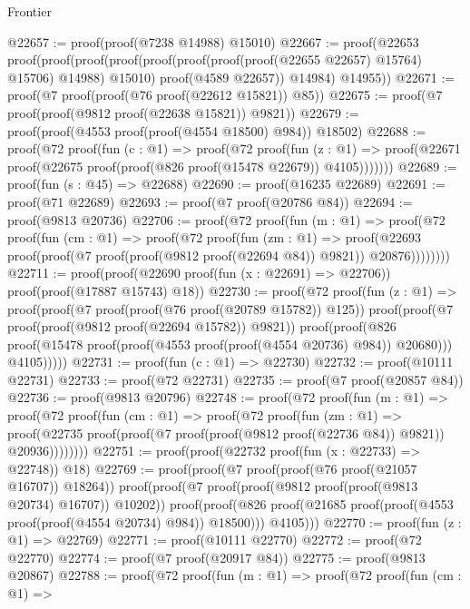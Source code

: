 \begin{lexlean}{Frontier}
\begin{coremodule}
@22657 := proof(proof(@7238 @14988) @15010)
@22667 := proof(@22653
      proof(proof(proof(proof(proof(proof(proof(proof(@22655 @22657) @15764) @15706) @14988) @15010)
              proof(@4589 @22657))
            @14984)
          @14955))
@22671 := proof(@7 proof(proof(@76 proof(@22612 @15821)) @85))
@22675 := proof(@7 proof(proof(@9812 proof(@22638 @15821)) @9821))
@22679 := proof(proof(@4553 proof(proof(@4554 @18500) @984)) @18502)
@22688 := proof(@72
      proof(fun (c : @1) =>
        proof(@72
            proof(fun (z : @1) =>
              proof(@22671 proof(@22675 proof(proof(@826 proof(@15478 @22679)) @4105)))))))
@22689 := proof(fun (s : @45) => @22688)
@22690 := proof(@16235 @22689)
@22691 := proof(@71 @22689)
@22693 := proof(@7 proof(@20786 @84))
@22694 := proof(@9813 @20736)
@22706 := proof(@72
      proof(fun (m : @1) =>
        proof(@72
            proof(fun (cm : @1) =>
              proof(@72
                  proof(fun (zm : @1) =>
                    proof(@22693
                        proof(proof(@7 proof(proof(@9812 proof(@22694 @84)) @9821)) @20876))))))))
@22711 := proof(proof(@22690 proof(fun (x : @22691) => @22706)) proof(proof(@17887 @15743) @18))
@22730 := proof(@72
      proof(fun (z : @1) =>
        proof(proof(@7 proof(proof(@76 proof(@20789 @15782)) @125))
            proof(proof(@7 proof(proof(@9812 proof(@22694 @15782)) @9821))
                proof(proof(@826
                      proof(@15478 proof(proof(@4553 proof(proof(@4554 @20736) @984)) @20680)))
                    @4105)))))
@22731 := proof(fun (c : @1) => @22730)
@22732 := proof(@10111 @22731)
@22733 := proof(@72 @22731)
@22735 := proof(@7 proof(@20857 @84))
@22736 := proof(@9813 @20796)
@22748 := proof(@72
      proof(fun (m : @1) =>
        proof(@72
            proof(fun (cm : @1) =>
              proof(@72
                  proof(fun (zm : @1) =>
                    proof(@22735
                        proof(proof(@7 proof(proof(@9812 proof(@22736 @84)) @9821)) @20936))))))))
@22751 := proof(proof(@22732 proof(fun (x : @22733) => @22748)) @18)
@22769 := proof(proof(@7 proof(proof(@76 proof(@21057 @16707)) @18264))
      proof(proof(@7 proof(proof(@9812 proof(proof(@9813 @20734) @16707)) @10202))
          proof(proof(@826 proof(@21685 proof(proof(@4553 proof(proof(@4554 @20734) @984)) @18500)))
              @4105)))
@22770 := proof(fun (z : @1) => @22769)
@22771 := proof(@10111 @22770)
@22772 := proof(@72 @22770)
@22774 := proof(@7 proof(@20917 @84))
@22775 := proof(@9813 @20867)
@22788 := proof(@72
      proof(fun (m : @1) =>
        proof(@72
            proof(fun (cm : @1) =>

\end{coremodule}
\end{lexlean}
